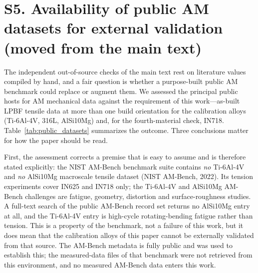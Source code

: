 \documentclass[12pt,a4paper,twocolumn]{article}
\begin{document}
\section*{S5. Availability of public AM datasets for external validation (moved from the main text)}

The independent out-of-source checks of the main text rest on literature values compiled by hand, and a
fair question is whether a purpose-built public AM benchmark could replace or augment them. We assessed the
principal public hosts for AM mechanical data against the requirement of this work---as-built LPBF tensile
data at more than one build orientation for the calibration alloys (Ti-6Al-4V, 316L, AlSi10Mg) and, for the
fourth-material check, IN718. Table~\ref{tab:public_datasets} summarizes the outcome. Three conclusions
matter for how the paper should be read.

First, the assessment corrects a premise that is easy to assume and is therefore stated explicitly: the
NIST AM-Bench benchmark suite contains \emph{no} Ti-6Al-4V and \emph{no} AlSi10Mg macroscale tensile
dataset (NIST AM-Bench, 2022). Its tension experiments cover IN625 and IN718 only; the Ti-6Al-4V and
AlSi10Mg AM-Bench challenges are fatigue, geometry, distortion and surface-roughness studies. A
full-text search of the public AM-Bench record set returns no AlSi10Mg entry at all, and the Ti-6Al-4V
entry is high-cycle rotating-bending fatigue rather than tension. This is a property of the benchmark, not
a failure of this work, but it does mean that the calibration alloys of this paper cannot be externally
validated from that source. The AM-Bench metadata is fully public and was used to establish this; the
measured-data files of that benchmark were not retrieved from this environment, and no
measured AM-Bench data enters this work.
\end{document}
